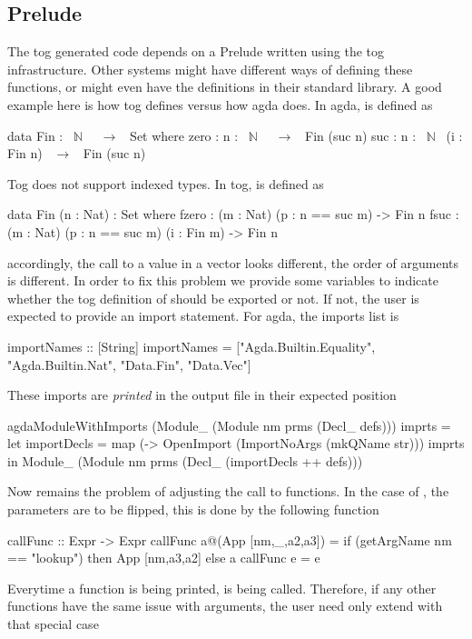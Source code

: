\subsection{Prelude}
The tog generated code depends on a Prelude written using the tog infrastructure. Other systems might have different ways of defining these functions, or might even have the definitions in their standard library. A good example here is how tog defines  versus how agda does. 
In agda,  is defined as 
\begin{agdacode}
data Fin : ~$\mathbb{N}$~ ~$\rightarrow$~ Set where
  zero : {n : ~$\mathbb{N}$~} ~$\rightarrow$~ Fin (suc n)
  suc  : {n : ~$\mathbb{N}$~} (i : Fin n) ~$\rightarrow$~ Fin (suc n)
\end{agdacode}
Tog does not support indexed types. In tog,  is defined as 
\begin{togcode}
data Fin (n : Nat) : Set where
  fzero : (m : Nat) (p : n == suc m) -> Fin n
  fsuc  : (m : Nat) (p : n == suc m) (i : Fin m) -> Fin n
\end{togcode}
accordingly, the call to  a value in a vector looks different, the order of arguments is different. In order to fix this problem we provide some variables  to indicate whether the tog definition of  should be exported or not. If not, the user is expected to provide an import statement. For agda, the imports list is 
\begin{hscode}
importNames :: [String]
importNames =
  ["Agda.Builtin.Equality",
   "Agda.Builtin.Nat",
   "Data.Fin", 
   "Data.Vec"]
\end{hscode}
These imports are \emph{printed} in the output file in their expected position 
\begin{hscode}
agdaModuleWithImports (Module_ (Module nm prms (Decl_ defs))) imprts =
  let importDecls = map (\str -> OpenImport (ImportNoArgs (mkQName str))) imprts 
  in Module_ (Module nm prms (Decl_ (importDecls ++ defs)))
\end{hscode}
Now remains the problem of adjusting the call to functions. In the case of , the parameters are to be flipped, this is done by the following function 
\begin{hscode}
callFunc :: Expr -> Expr
callFunc a@(App [nm,_,a2,a3]) =
  if (getArgName nm == "lookup") then App [nm,a3,a2] else a
callFunc e = e
\end{hscode}
Everytime a function is being printed,  is being called. Therefore, if any other functions have the same issue with arguments, the user need only extend  with that special case 

